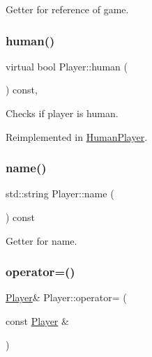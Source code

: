 Getter for reference of game. 

\mbox{\label{class_player_a47c5497b2d8bf5d745e85952d0bf097f}} 
\subsubsection{\texorpdfstring{human()}{human()}}
{\footnotesize\ttfamily virtual bool Player\+::human (\begin{DoxyParamCaption}{ }\end{DoxyParamCaption}) const\hspace{0.3cm}{\ttfamily [inline]}, {\ttfamily [virtual]}}



Checks if player is human. 



Reimplemented in \mbox{\hyperlink{class_human_player_acecbe621447504a013c2a763aaba05fa}{Human\+Player}}.

\mbox{\label{class_player_a422139ad63182cfc9f82305b87a3f9a5}} 
\subsubsection{\texorpdfstring{name()}{name()}}
{\footnotesize\ttfamily std\+::string Player\+::name (\begin{DoxyParamCaption}{ }\end{DoxyParamCaption}) const\hspace{0.3cm}{\ttfamily [inline]}}



Getter for name. 

\mbox{\label{class_player_ab81d34e4adb4e329d26b1635d866462d}} 
\subsubsection{\texorpdfstring{operator=()}{operator=()}}
{\footnotesize\ttfamily \mbox{\hyperlink{class_player}{Player}}\& Player\+::operator= (\begin{DoxyParamCaption}\item[{const \mbox{\hyperlink{class_player}{Player}} \&}]{ }\end{DoxyParamCaption})\hspace{0.3cm}{\ttfamily [delete]}}

